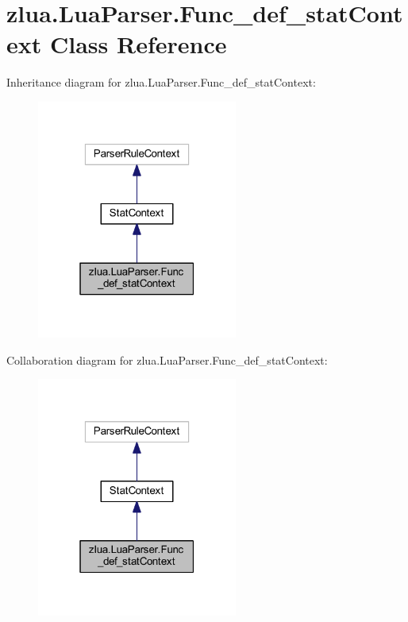 \hypertarget{classzlua_1_1_lua_parser_1_1_func__def__stat_context}{}\section{zlua.\+Lua\+Parser.\+Func\+\_\+def\+\_\+stat\+Context Class Reference}
\label{classzlua_1_1_lua_parser_1_1_func__def__stat_context}


Inheritance diagram for zlua.\+Lua\+Parser.\+Func\+\_\+def\+\_\+stat\+Context\+:
\nopagebreak
\begin{figure}[H]
\begin{center}
\leavevmode
\includegraphics[width=187pt]{classzlua_1_1_lua_parser_1_1_func__def__stat_context__inherit__graph}
\end{center}
\end{figure}


Collaboration diagram for zlua.\+Lua\+Parser.\+Func\+\_\+def\+\_\+stat\+Context\+:
\nopagebreak
\begin{figure}[H]
\begin{center}
\leavevmode
\includegraphics[width=187pt]{classzlua_1_1_lua_parser_1_1_func__def__stat_context__coll__graph}
\end{center}
\end{figure}
